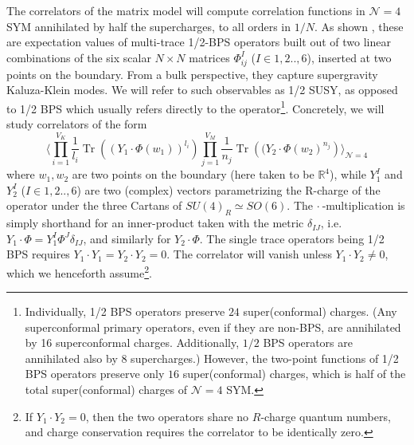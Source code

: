 \documentclass[english]{article}
\DeclareMathOperator{\Tr}{Tr}
\renewcommand{\>}{\rangle}
\newcommand{\<}{\langle}
\renewcommand{\(}{\left(}
\renewcommand{\)}{\right)}
\begin{document}
The correlators of the matrix model will compute correlation functions in  $\mathcal{N}=4$ SYM annihilated by half the supercharges, to all orders in $1/N$.   As shown \cite{Drukker:2008pi,Drukker:2009sf}, these are expectation values of multi-trace 1/2-BPS operators built out of two linear combinations of the six scalar $N \times N$ matrices $\Phi^{I}_{ij}$ ($I \in {1,2..,6}$), inserted at two points on the boundary. From a bulk perspective, they capture supergravity Kaluza-Klein modes. We will refer to such observables as 1/2 SUSY, as opposed to 1/2 BPS which usually refers directly to the operator\footnote{Individually, 1/2 BPS operators preserve $24$ super(conformal) charges. (Any superconformal primary operators, even if they are non-BPS, are annihilated by 16 superconformal charges. Additionally, $1/2$ BPS operators are annihilated also by 8 supercharges.) However, the two-point functions of 1/2 BPS operators preserve only $16$ super(conformal) charges, which is half of the total super(conformal) charges of $\mathcal{N}=4$ SYM.}. Concretely, we will study correlators of the form
\begin{equation}
   \Big\langle \prod_{i=1}^{V_{K}} \frac{1}{l_{i}} \Tr \left( (Y_1 \cdot \Phi(w_{1}))^{l_{i}} \right) \prod_{j=1}^{V_{M}} \frac{1}{n_{j}}\Tr \left( (Y_2 \cdot \Phi(w_{2})^{n_{j}} \right) \Big\rangle_{\mathcal{N}=4}  \label{eq:N=4correlator}
\end{equation}
where $w_1,w_2$ are two points on the boundary (here taken to be $\mathbb{R}^{4}$), while $Y_{1}^I$ and $Y_{2}^{I}$ ($I \in {1,2..,6}$) are two (complex) vectors parametrizing the R-charge of the operator under the three Cartans of $SU(4)_{R} \simeq SO(6)$. The $\cdot \ $-multiplication is simply shorthand for an inner-product taken with the metric $\delta_{IJ}$, i.e. $Y_{1} \cdot \Phi = Y_{1}^{I} \Phi^{J} \delta_{IJ}$, and similarly for $Y_{2} \cdot \Phi$. The single trace operators being 1/2 BPS requires $Y_{1} \cdot Y_{1} = Y_{2} \cdot Y_{2} = 0$. The correlator will vanish unless $Y_{1} \cdot Y_{2} \neq 0$, which we henceforth assume\footnote{If $Y_{1} \cdot Y_{2} = 0$, then the two operators share no $R$-charge quantum numbers, and charge conservation requires the correlator to be identically zero.}. 
\end{document}
